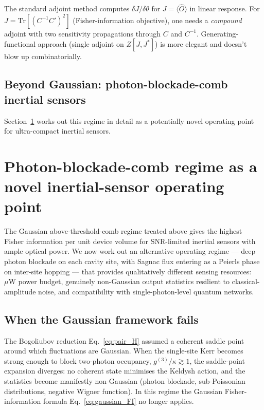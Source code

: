 \documentclass[11pt]{article}
\begin{document}
The standard adjoint method computes $\delta J/\delta\theta$ for
$J=\langle\hat O\rangle$ in linear response.  For
$J = \mathrm{Tr}[(C^{-1}C')^2]$ (Fisher-information objective), one
needs a \emph{compound} adjoint with two sensitivity propagations
through $C$ and $C^{-1}$.  Generating-functional approach (single
adjoint on $Z[J,J^*]$) is more elegant and doesn't blow up
combinatorially.

\subsection{Beyond Gaussian: photon-blockade-comb inertial sensors}

Section~\ref{sec:blockade} works out this regime in detail as a
potentially novel operating point for ultra-compact inertial sensors.

\section{Photon-blockade-comb regime as a novel inertial-sensor operating point}
\label{sec:blockade}

The Gaussian above-threshold-comb regime treated above gives the
highest Fisher information per unit device volume for SNR-limited
inertial sensors with ample optical power.  We now work out an
alternative operating regime --- deep photon blockade on each cavity
site, with Sagnac flux entering as a Peierls phase on inter-site
hopping --- that provides qualitatively different sensing resources:
$\mu\mathrm{W}$ power budget, genuinely non-Gaussian output statistics
resilient to classical-amplitude noise, and compatibility with
single-photon-level quantum networks.

\subsection{When the Gaussian framework fails}

The Bogoliubov reduction Eq.~\eqref{eq:pair_H} assumed a coherent
saddle point around which fluctuations are Gaussian.  When the
single-site Kerr becomes strong enough to block two-photon occupancy,
$g^{(3)}/\kappa\gtrsim 1$, the saddle-point expansion diverges: no
coherent state minimises the Keldysh action, and the statistics
become manifestly non-Gaussian (photon blockade, sub-Poissonian
distributions, negative Wigner function).  In this regime the
Gaussian Fisher-information formula
Eq.~\eqref{eq:gaussian_FI} no longer applies.
\end{document}
